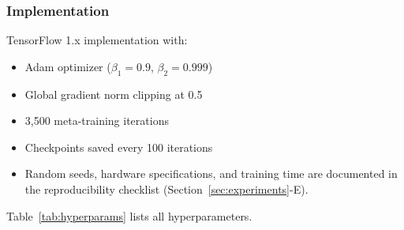 \documentclass[journal,twoside]{IEEEtran}
\begin{document}
\subsubsection{Implementation}

TensorFlow 1.x implementation with:
\begin{itemize}
    \item Adam optimizer ($\beta_1=0.9$, $\beta_2=0.999$)
    \item Global gradient norm clipping at 0.5
    \item 3,500 meta-training iterations
    \item Checkpoints saved every 100 iterations
    \item Random seeds, hardware specifications, and training time are documented in the reproducibility checklist (Section~\ref{sec:experiments}-E).
\end{itemize}

Table~\ref{tab:hyperparams} lists all hyperparameters.

    \begin{table}[t]
    \centering
\caption{Hyperparameter Configuration}
\label{tab:hyperparams}
\footnotesize
{}
    \end{table}
\end{document}
